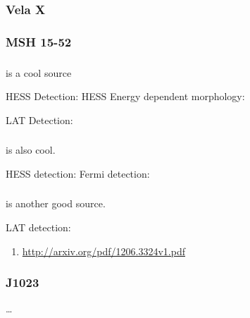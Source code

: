 \subsubsection{Vela X}

\subsubsection{MSH 15-52}


\subsubsection{}

 is a cool source

HESS Detection: 
HESS Energy dependent morphology: \cite{aharonian_2006_energy-dependent}

LAT Detection: \cite{grondin_2011_detection-pulsar}



\subsubsection{}

 is also cool.

HESS detection:  \cite{aharonian_2006_h.e.s.s.-survey}
Fermi detection: \cite{slane_2010_fermi-detection}

\subsubsection{}

 is another good source.

LAT detection: \cite{rousseau_2012_fermi-lat-constraints}

\begin{enumerate}
  \item \url{http://arxiv.org/pdf/1206.3324v1.pdf}
\end{enumerate}

\subsubsection{J1023}

\ldots
